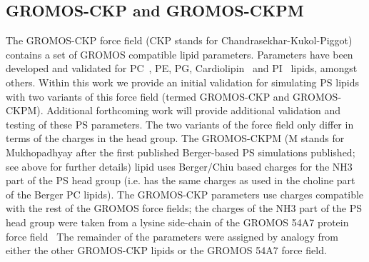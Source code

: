 \documentclass[journal=jpcbfk,manuscript=article]{achemso}
\newcommand{\todo}[1]{\textcolor{red}{#1}}
\begin{document}
\subsection{GROMOS-CKP and GROMOS-CKPM}
The GROMOS-CKP force field (CKP stands for Chandrasekhar-Kukol-Piggot) contains a set of GROMOS compatible lipid parameters.
Parameters have been developed and validated for PC~\cite{Chandrasekhar03,kukol09,piggot12},
PE, PG, Cardiolipin~\cite{piggot11}
and PI~\cite{holdbrook10}
lipids, amongst others.
Within this work we provide an initial validation for simulating PS lipids with two variants of
this force field (termed GROMOS-CKP and GROMOS-CKPM). Additional forthcoming work will provide additional
validation and testing of these PS parameters. The two variants of the force field only differ in terms
of the charges in the head group. The GROMOS-CKPM (M stands for Mukhopadhyay after the first published
Berger-based PS simulations published; see above for further details) lipid uses Berger/Chiu based charges
for the NH3 part of the PS head group (i.e. has the same charges as used in the choline part of the Berger PC lipids).
The GROMOS-CKP parameters use charges compatible with the rest of the GROMOS force fields;
the  charges of the NH3 part of the PS head group were taken from a lysine side-chain of the GROMOS 54A7 protein
force field~\cite{schmid11} %
The remainder of the parameters were assigned by analogy from either the other GROMOS-CKP lipids or the GROMOS 54A7 force field.
\end{document}
